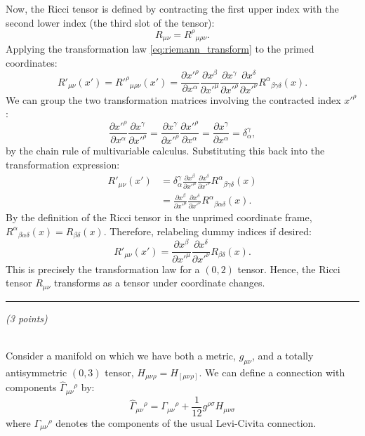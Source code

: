 \documentclass[12pt]{article}
\newcommand{\be}{\begin{equation}}
\newcommand{\ee}{\end{equation}}
\newcounter{quesno}
\newcommand{\ques}[1]{\vspace{2em}\stepcounter{quesno}
\noindent{\bf Question \thequesno.} \emph{(#1 points)\\}
}
\begin{document}
Now, the Ricci tensor is defined by contracting the first upper index with the second lower index (the third slot of the tensor):
\begin{equation}
R_{\mu\nu} = R^\rho{}_{\mu\rho\nu}.
\end{equation}
Applying the transformation law \eqref{eq:riemann_transform} to the primed coordinates:
\begin{equation}
R'_{\mu\nu}(x') = R'^\rho{}_{\mu\rho\nu}(x') = \frac{\partial x'^\rho}{\partial x^\alpha} \frac{\partial x^\beta}{\partial x'^\mu} \frac{\partial x^\gamma}{\partial x'^\rho} \frac{\partial x^\delta}{\partial x'^\nu} R^\alpha{}_{\beta\gamma\delta}(x).
\end{equation}
We can group the two transformation matrices involving the contracted index $x'^\rho$:
\begin{equation}
\frac{\partial x'^\rho}{\partial x^\alpha} \frac{\partial x^\gamma}{\partial x'^\rho} = \frac{\partial x^\gamma}{\partial x'^\rho} \frac{\partial x'^\rho}{\partial x^\alpha} = \frac{\partial x^\gamma}{\partial x^\alpha} = \delta^\gamma_\alpha,
\end{equation}
by the chain rule of multivariable calculus. Substituting this back into the transformation expression:
\begin{align}
R'_{\mu\nu}(x') &= \delta^\gamma_\alpha \frac{\partial x^\beta}{\partial x'^\mu} \frac{\partial x^\delta}{\partial x'^\nu} R^\alpha{}_{\beta\gamma\delta}(x) \nonumber \\
&= \frac{\partial x^\beta}{\partial x'^\mu} \frac{\partial x^\delta}{\partial x'^\nu} R^\alpha{}_{\beta\alpha\delta}(x).
\end{align}
By the definition of the Ricci tensor in the unprimed coordinate frame, $R^\alpha{}_{\beta\alpha\delta}(x) = R_{\beta\delta}(x)$. Therefore, relabeling dummy indices if desired:
\begin{equation}
R'_{\mu\nu}(x') = \frac{\partial x^\beta}{\partial x'^\mu} \frac{\partial x^\delta}{\partial x'^\nu} R_{\beta\delta}(x).
\end{equation}
This is precisely the transformation law for a $(0,2)$ tensor. Hence, the Ricci tensor $R_{\mu\nu}$ transforms as a tensor under coordinate changes.

\vspace{1.5em}
\hrule

\ques{3}
\\
Consider a manifold on which we have both a metric, $g_{\mu\nu}$, and a totally antisymmetric $(0,3)$ tensor, $H_{\mu\nu\rho} = H_{[\mu\nu\rho]}$.
We can define a connection with components $\hat\Gamma_{\mu\nu}{}^\rho$ by:
\be
\hat \Gamma_{\mu\nu}{}^\rho = \Gamma_{\mu\nu}{}^\rho + \frac{1}{12} g^{\rho \sigma} H_{\mu\nu\sigma}
\label{stringconn}
\ee
where $\Gamma_{\mu\nu}{}^\rho$ denotes the components of the usual Levi-Civita connection.
\end{document}
